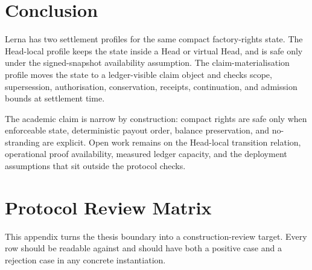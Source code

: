 \documentclass[a4paper,11pt]{article}
\theoremstyle{definition}
\theoremstyle{plain}
\theoremstyle{remark}
\begin{document}
\section{Conclusion}
\label{sec:conclusion}

Lerna has two settlement profiles for the same compact factory-rights state.
The Head-local profile keeps the state inside a Head or virtual Head, and is
safe only under the signed-snapshot availability assumption. The
claim-materialisation profile moves the state to a ledger-visible claim object
and checks scope, supersession, authorisation, conservation, receipts,
continuation, and admission bounds at settlement time.

The academic claim is narrow by construction: compact rights are safe only when
enforceable state, deterministic payout order, balance preservation, and
no-stranding are explicit. Open work remains on the Head-local transition
relation, operational proof availability, measured ledger capacity, and the
deployment assumptions that sit outside the protocol checks.

\appendix
\section{Protocol Review Matrix}
\label{app:review-matrix}

This appendix turns the thesis boundary into a construction-review target.
Every row should be readable against 
and should have both a positive case and a rejection case in any concrete
instantiation.
\end{document}
